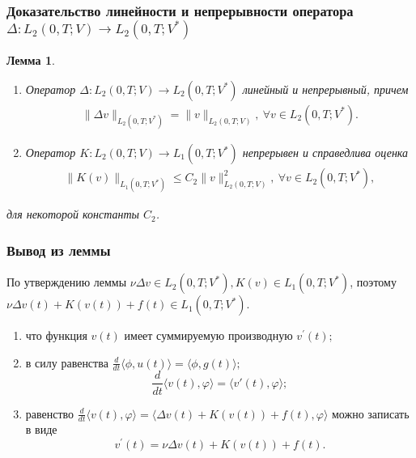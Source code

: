 \documentclass[10pt, pdf, hyperref={unicode}]{beamer}
\newtheorem{ru_lemma}{Лемма}
\renewenvironment{lemma}{\begin{ru_lemma}}{\end{ru_lemma}}
\begin{document}
  \begin{frame}
    \frametitle{Доказательство линейности и непрерывности оператора $\Delta:L_2 (0,T;V)→L_2 (0,T;V^*)$}
    \begin{center}
      \begin{minipage}[h]{0.97\linewidth}
      \begin{lemma} ~\\
    \begin{enumerate}
        \item Оператор $\Delta: L_2(0, T; V) \rightarrow L_2(0, T; V^\ast)$ линейный и\linebreak
        непрерывный, причем
        \begin{equation}\label{eq:5.9}
            \begin{gathered}
                \| \Delta v \|_{L_2(0, T; V^\ast)} = \| v \|_{L_2(0, T; V)}, \ \forall v \in L_2(0, T; V^\ast).
            \end{gathered}
        \end{equation}
        \item Оператор $K: L_2(0, T; V) \rightarrow L_1(0, T; V^\ast)$ непрерывен и справедлива оценка
        \begin{equation}\label{eq:5.10}
            \begin{gathered}
                \| K(v) \|_{L_1(0, T; V^\ast)} \leqslant C_2\| v \|^2_{L_2(0, T;V)}, \ \forall v \in L_2(0, T; V^\ast),
            \end{gathered}
        \end{equation}
    \end{enumerate}
    для некоторой константы $C_2$.
\end{lemma}
      \end{minipage}
    \end{center}
  \end{frame}

    \begin{frame}
    \frametitle{Вывод из леммы}
    \begin{center}
      \begin{minipage}[h]{0.97\linewidth}
      По утверждению леммы $\nu\Delta v \in L_2(0, T; V^\ast), K(v) \in L_1(0, T; V^\ast)$, поэтому $\nu\Delta v(t) + K(v(t)) + f(t) \in L_1(0, T; V^\ast)$.
      \begin{enumerate}
      \item что функция $v(t)$ имеет суммируемую производную $v^\prime(t);$
      \item в силу равенства $\frac{d}{dt}\langle \phi, u(t) \rangle = \langle \phi, g(t) \rangle;$
      $$\frac{d}{dt} \langle v(t), \varphi \rangle = \langle v'(t), \varphi \rangle;$$
      \item равенство $\frac{d}{dt}\langle v(t), \varphi \rangle=\langle \Delta v(t)+K(v(t))+f(t),\varphi\rangle$ можно записать в виде
      $$v^\prime(t)=\nu\Delta v(t)+K(v(t))+f(t).$$
      \end{enumerate}
      \end{minipage}
    \end{center}
  \end{frame}
\end{document}
